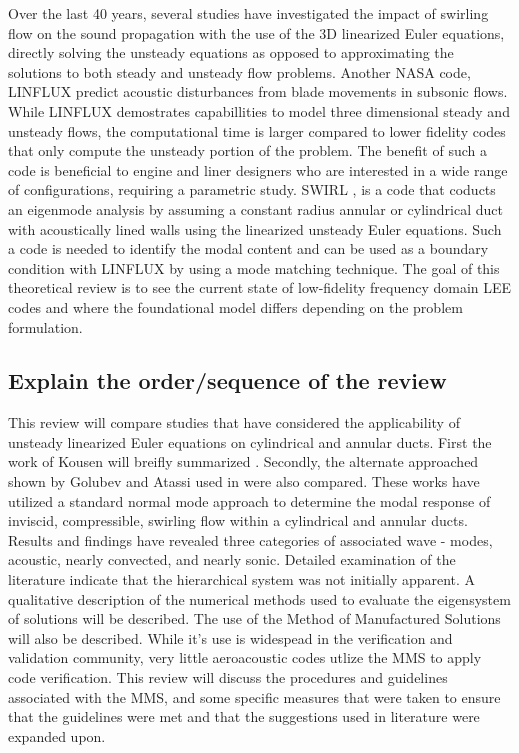 Over the last 40 years, several studies have investigated the impact of 
swirling flow on the sound propagation with the use of the 3D linearized Euler
equations, directly solving the unsteady equations as opposed to approximating 
the solutions to both steady and unsteady flow problems. Another NASA code, 
LINFLUX predict acoustic disturbances from blade movements in subsonic flows. 
While LINFLUX demostrates capabillities to model three dimensional steady and 
unsteady flows, the computational time is larger compared to lower fidelity codes
that only compute the unsteady portion of the problem. The benefit of such a 
code is beneficial to engine and liner designers who are interested in 
a wide range of configurations, requiring a parametric study. SWIRL \cite{kousen1995eigenmode}, 
is a code that coducts an eigenmode analysis by assuming a constant radius annular or 
cylindrical duct with acoustically lined walls using the linearized unsteady Euler
equations. Such a code is needed to identify the modal content and can be 
used as a boundary condition with LINFLUX by using a mode matching technique. 
The goal of this theoretical review is to see the current state of low-fidelity
frequency domain LEE codes and where the foundational model differs depending
on the problem formulation. 

\subsection{Explain the order/sequence of the review}
This review will compare studies that have considered the applicability of 
unsteady linearized Euler equations on cylindrical and annular ducts. First the
work of Kousen will breifly summarized \cite{kousen1995eigenmode,kousen1996pressure}. Secondly, 
the alternate approached shown by Golubev and Atassi used in \cite{Golubev1998,Golubev1997} 
were also compared. These works have utilized a standard normal mode approach 
to determine the modal response of inviscid, compressible, swirling flow 
within a cylindrical and annular ducts. Results and findings have revealed 
three categories of associated wave - modes, acoustic, nearly convected, 
and nearly sonic. Detailed examination of the literature indicate that the 
hierarchical system was not initially apparent. A qualitative description of 
the numerical methods used to evaluate the eigensystem of solutions will be
described.
The use of the Method of Manufactured Solutions will also be described. While 
it's use is widespead in the verification and validation community, very little
aeroacoustic codes utlize the MMS to apply code verification. This review will
discuss the procedures and guidelines associated with the MMS, and some specific
measures that were taken to ensure that the guidelines were met and that the 
suggestions used in literature were expanded upon. 

